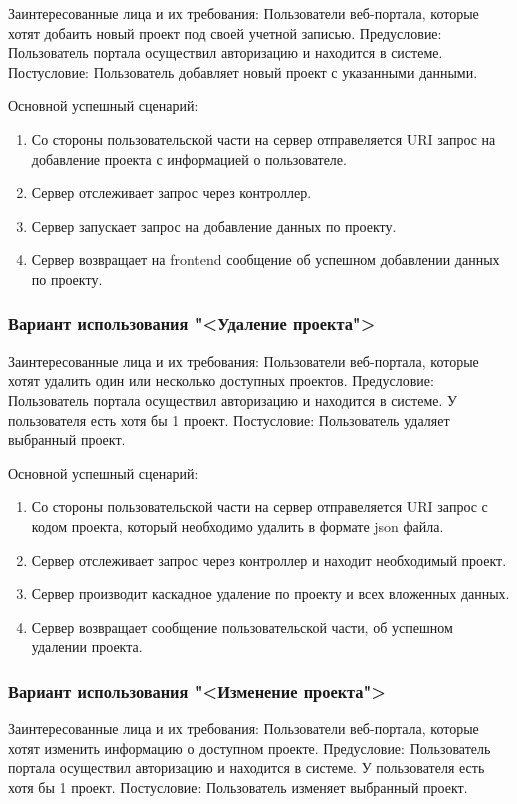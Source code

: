Заинтересованные лица и их требования: Пользователи веб-портала, которые хотят добаить новый проект под своей учетной записью.
Предусловие: Пользователь портала осуществил авторизацию и находится в системе. Постусловие: Пользователь добавляет новый проект с указанными данными.

Основной успешный сценарий:
\begin{enumerate}
	\item Со стороны пользовательской части на сервер отправеляется URI запрос на добавление проекта с информацией о пользователе.
	\item Сервер отслеживает запрос через контроллер.
	\item Сервер запускает запрос на добавление данных по проекту.
	\item Сервер возвращает на frontend сообщение об успешном добавлении данных по проекту.
\end{enumerate}

\subsubsection{Вариант использования "<Удаление проекта">}

Заинтересованные лица и их требования: Пользователи веб-портала, которые хотят удалить один или несколько доступных проектов.
Предусловие: Пользователь портала осуществил авторизацию и находится в системе. У пользователя есть хотя бы 1 проект. Постусловие: Пользователь удаляет выбранный проект.

Основной успешный сценарий:
\begin{enumerate}
	\item Со стороны пользовательской части на сервер отправеляется URI запрос с кодом проекта, который необходимо удалить в формате json файла.
	\item Сервер отслеживает запрос через контроллер и находит необходимый проект.
	\item Сервер производит каскадное удаление по проекту и всех вложенных данных. 
	\item Сервер возвращает сообщение пользовательской части, об успешном удалении проекта.
\end{enumerate}

\subsubsection{Вариант использования "<Изменение проекта">}

Заинтересованные лица и их требования: Пользователи веб-портала, которые хотят изменить информацию о доступном проекте.
Предусловие: Пользователь портала осуществил авторизацию и находится в системе. У пользователя есть хотя бы 1 проект. Постусловие: Пользователь изменяет выбранный проект.

